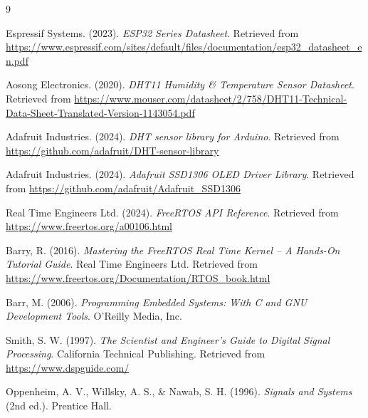 \begin{thebibliography}{9}

    Espressif Systems. (2023). \textit{ESP32 Series Datasheet}.
    Retrieved from \url{https://www.espressif.com/sites/default/files/documentation/esp32_datasheet_en.pdf}

    Aosong Electronics. (2020). \textit{DHT11 Humidity \& Temperature Sensor Datasheet}.
    Retrieved from \url{https://www.mouser.com/datasheet/2/758/DHT11-Technical-Data-Sheet-Translated-Version-1143054.pdf}

    Adafruit Industries. (2024). \textit{DHT sensor library for Arduino}.
    Retrieved from \url{https://github.com/adafruit/DHT-sensor-library}

    Adafruit Industries. (2024). \textit{Adafruit SSD1306 OLED Driver Library}.
    Retrieved from \url{https://github.com/adafruit/Adafruit_SSD1306}

    Real Time Engineers Ltd. (2024). \textit{FreeRTOS API Reference}.
    Retrieved from \url{https://www.freertos.org/a00106.html}

    Barry, R. (2016). \textit{Mastering the FreeRTOS Real Time Kernel -- A Hands-On Tutorial Guide}.
    Real Time Engineers Ltd.
    Retrieved from \url{https://www.freertos.org/Documentation/RTOS_book.html}

    Barr, M. (2006). \textit{Programming Embedded Systems: With C and GNU Development Tools}.
    O'Reilly Media, Inc.

    Smith, S. W. (1997). \textit{The Scientist and Engineer's Guide to Digital Signal Processing}.
    California Technical Publishing.
    Retrieved from \url{https://www.dspguide.com/}

    Oppenheim, A. V., Willsky, A. S., \& Nawab, S. H. (1996). \textit{Signals and Systems}
    (2nd ed.). Prentice Hall.

\end{thebibliography}
